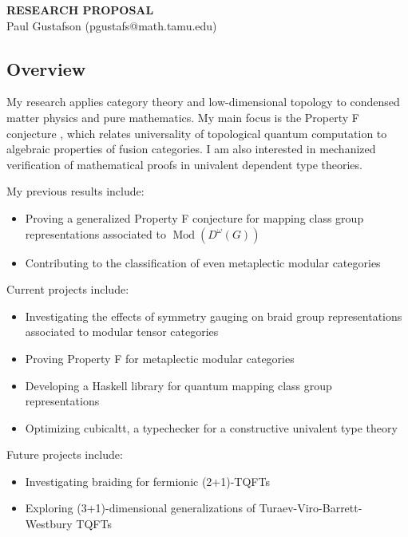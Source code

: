 \documentclass[12pt]{article}
\DeclareMathOperator{\Mod}{Mod}
\theoremstyle{plain} \numberwithin{equation}{section}
\theoremstyle{definition}
\begin{document}
\begin{center}
{\bf RESEARCH PROPOSAL}\\
\vspace*{0.1cm}
{\normalsize Paul Gustafson (pgustafs@math.tamu.edu)}
\end{center}




\subsection*{Overview}

My research applies category theory and low-dimensional topology to condensed matter physics and pure mathematics.   My main focus is the Property F conjecture \cite{nr}, which relates universality of topological quantum computation to algebraic properties of fusion categories. I am also interested in mechanized verification of mathematical proofs in univalent dependent type theories.

My previous results include: %
\begin{itemize}
\item Proving a generalized Property F conjecture for mapping class group representations associated to $\Mod(D^\omega(G))$ \cite{g}
\item Contributing to the classification of even metaplectic modular categories \cite{bgpr}
\end{itemize}
  
Current projects include:    %
\begin{itemize}
\item Investigating the effects of symmetry gauging on braid group representations associated to modular tensor categories
\item Proving Property F for metaplectic modular categories
\item Developing a Haskell library for quantum mapping class group representations
\item Optimizing cubicaltt, a typechecker for a constructive univalent type theory
\end{itemize}

Future projects include:
\begin{itemize}
  \item Investigating braiding for fermionic (2+1)-TQFTs \cite{walker}
  \item Exploring (3+1)-dimensional generalizations of Turaev-Viro-Barrett-Westbury TQFTs \cite{cui}
\end{itemize}
\end{document}
